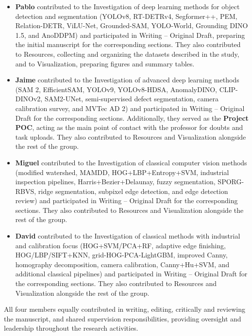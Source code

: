 \documentclass[11pt]{article}
\begin{document}
\begin{itemize}

\item \textbf{Pablo} contributed to the Investigation of deep learning methods 
for object detection and segmentation (YOLOv8, RT-DETRv4, Segformer++, PEM, 
Relation-DETR, ViLU-Net, Grounded-SAM, YOLO-World, Grounding DINO 1.5, and 
AnoDDPM) and participated in Writing -- Original Draft, preparing the initial 
manuscript for the corresponding sections. They also contributed to Resources, 
collecting and organizing the datasets described in the study, and to 
Visualization, preparing figures and summary tables.

\item \textbf{Jaime} contributed to the Investigation of advanced deep learning 
methods (SAM 2, EfficientSAM, YOLOv9, YOLOv8-HDSA, AnomalyDINO, CLIP-DINOv2, 
SAM2-UNet, semi-supervised defect segmentation, camera calibration survey, and 
MVTec AD 2) and participated in Writing -- Original Draft for the corresponding 
sections. Additionally, they served as the \textbf{Project POC}, acting as the 
main point of contact with the professor for doubts and task uploads. They also 
contributed to Resources and Visualization alongside the rest of the group.

\item \textbf{Miguel} contributed to the Investigation of classical computer 
vision methods (modified watershed, MAMDD, HOG+LBP+Entropy+SVM, industrial 
inspection pipelines, Harris+Bezier+Delaunay, fuzzy segmentation, SPORG-RBVS, 
ridge segmentation, subpixel edge detection, and edge detection review) and 
participated in Writing -- Original Draft for the corresponding sections. They 
also contributed to Resources and Visualization alongside the rest of the group.

\item \textbf{David} contributed to the Investigation of classical methods with 
industrial and calibration focus (HOG+SVM/PCA+RF, adaptive edge finishing, 
HOG/LBP/SIFT+KNN, grid-HOG-PCA-LightGBM, improved Canny, homography 
decomposition, camera calibration, Canny+Hu+SVM, and additional classical 
pipelines) and participated in Writing -- Original Draft for the corresponding 
sections. They also contributed to Resources and Visualization alongside the 
rest of the group.

\end{itemize}

All four members equally contributed in writing, editing, critically and 
reviewing the manuscript, and shared supervision responsibilities, 
providing oversight and leadership throughout the research activities.


\medskip

 

\newpage
\end{document}
